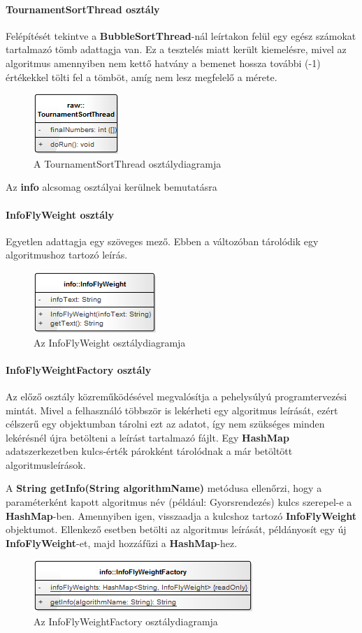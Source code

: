 \documentclass{elteikthesis}
\begin{document}
\paragraph{TournamentSortThread osztály}
Felépítését tekintve a \textbf{BubbleSortThread}-nál leírtakon felül egy egész számokat tartalmazó tömb adattagja van. Ez a tesztelés miatt került kiemelésre, mivel az algoritmus amennyiben nem kettő hatvány a bemenet hossza további (-1) értékekkel tölti fel a tömböt, amíg nem lesz megfelelő a mérete.
\begin{figure}[H]
	\centering
	\includegraphics{pics/class/TournamentSortThread.png}
	\caption{A TournamentSortThread osztálydiagramja}
\end{figure}
Az \textbf{info} alcsomag osztályai kerülnek bemutatásra
\paragraph{InfoFlyWeight osztály}
Egyetlen adattagja egy szöveges mező. Ebben a változóban tárolódik egy algoritmushoz tartozó leírás.
\begin{figure}[H]
	\centering
	\includegraphics{pics/class/InfoFlyWeight.png}
	\caption{Az InfoFlyWeight osztálydiagramja}
\end{figure}
\paragraph{InfoFlyWeightFactory osztály}
Az előző osztály közreműködésével megvalósítja a pehelysúlyú programtervezési mintát. Mivel a felhasználó többször is lekérheti egy algoritmus leírását, ezért célszerű egy objektumban tárolni ezt az adatot, így nem szükséges minden lekérésnél újra betölteni a leírást tartalmazó fájlt. Egy \textbf{HashMap} adatszerkezetben kulcs-érték párokként tárolódnak a már betöltött algoritmusleírások.\par
A \textbf{String getInfo(String algorithmName)} metódusa ellenőrzi, hogy a paraméterként kapott algoritmus név (például: Gyorsrendezés) kulcs szerepel-e a \textbf{HashMap}-ben. Amennyiben igen, visszaadja a kulcshoz tartozó \textbf{InfoFlyWeight} objektumot. Ellenkező esetben betölti az algoritmus leírását, példányosít egy új \textbf{InfoFlyWeight}-et, majd hozzáfűzi a \textbf{HashMap}-hez.
\begin{figure}[H]
	\centering
	\includegraphics{pics/class/InfoFlyWeightFactory.png}
	\caption{Az InfoFlyWeightFactory osztálydiagramja}
\end{figure}
\end{document}
